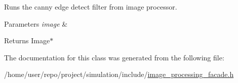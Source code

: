 Runs the canny edge detect filter from image processor. 


\begin{DoxyParams}{Parameters}
{\em image} & \\
\hline
\end{DoxyParams}
\begin{DoxyReturn}{Returns}
Image$\ast$ 
\end{DoxyReturn}


The documentation for this class was generated from the following file\+:\begin{DoxyCompactItemize}
\item 
/home/user/repo/project/simulation/include/\hyperlink{image__processing__facade_8h}{image\+\_\+processing\+\_\+facade.\+h}\end{DoxyCompactItemize}
